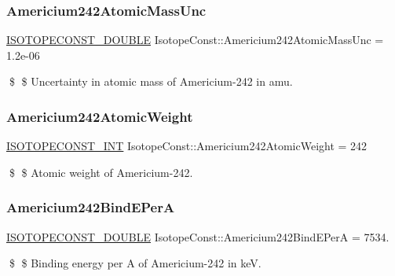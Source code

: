 \subsubsection{\texorpdfstring{Americium242\+Atomic\+Mass\+Unc}{Americium242AtomicMassUnc}}
{\footnotesize\ttfamily \mbox{\hyperlink{group___isotope_const-_macros_ga8f45a7272ce02c0b4c65c44636ed719a}{I\+S\+O\+T\+O\+P\+E\+C\+O\+N\+S\+T\+\_\+\+D\+O\+U\+B\+LE}} Isotope\+Const\+::\+Americium242\+Atomic\+Mass\+Unc = 1.\+2e-\/06}

\$ \$ Uncertainty in atomic mass of Americium-\/242 in amu. \mbox{\label{group___isotope_const-_americium-_am242_ga91e134c90a17a3ead9026873a297351f}} 
\subsubsection{\texorpdfstring{Americium242\+Atomic\+Weight}{Americium242AtomicWeight}}
{\footnotesize\ttfamily \mbox{\hyperlink{group___isotope_const-_macros_ga5f18360b3e99483a35c32d789e62621c}{I\+S\+O\+T\+O\+P\+E\+C\+O\+N\+S\+T\+\_\+\+I\+NT}} Isotope\+Const\+::\+Americium242\+Atomic\+Weight = 242}

\$ \$ Atomic weight of Americium-\/242. \mbox{\label{group___isotope_const-_americium-_am242_ga4279841df6dad39da2d7aa339e27c7ee}} 
\subsubsection{\texorpdfstring{Americium242\+Bind\+E\+PerA}{Americium242BindEPerA}}
{\footnotesize\ttfamily \mbox{\hyperlink{group___isotope_const-_macros_ga8f45a7272ce02c0b4c65c44636ed719a}{I\+S\+O\+T\+O\+P\+E\+C\+O\+N\+S\+T\+\_\+\+D\+O\+U\+B\+LE}} Isotope\+Const\+::\+Americium242\+Bind\+E\+PerA = 7534.}

\$ \$ Binding energy per A of Americium-\/242 in keV. \mbox{\label{group___isotope_const-_americium-_am242_ga97defc4a08db20fcf5eed1faf39cc2ea}} 
